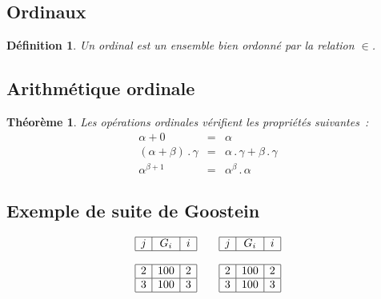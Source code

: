 \documentclass{article}
\newtheorem{de}{Définition}[subsection] %
\newtheorem{theo}{Théorème}[section]    %
\newcommand{\ordmult}{\mathop{.}} %
\begin{document}
\subsection{Ordinaux}
\begin{de}\label{def-ordinaux} %
Un \emph{ordinal} est un ensemble bien ordonné par la relation $\in$.
\end{de}

\subsection{Arithmétique ordinale}
\begin{theo}\label{theo-ordinaux}
Les opérations ordinales vérifient les propriétés suivantes~:
\begin{eqnarray}
  \alpha + 0                     &=& \alpha\label{eq-zero}\\
  (\alpha + \beta)\ordmult\gamma &=& \alpha\ordmult\gamma +
                                     \beta\ordmult\gamma\\
  \alpha^{\beta + 1}             &=& \alpha^\beta\ordmult\alpha
\end{eqnarray}
\end{theo}

\subsection{Exemple de suite de Goostein}
\begin{displaymath}
  \begin{array}{|c|c|c|} %
    \hline  %
    j & G_i & i\\ %
    \hline
    \multicolumn{3}{c}{\strut}\\ %
    \hline
    2 & 100 & 2\\
    \hline
    3 & 100 & 3\\
    \hline
  \end{array}
  \qquad %
  \begin{array}{|c|c|c|}
    \hline
    j & G_i & i\\
    \hline
    \multicolumn{3}{c}{\strut}\\
    \hline
    2 & 100 & 2\\
    \hline
    3 & 100 & 3\\
    \hline
  \end{array}
\end{displaymath}
\end{document}
